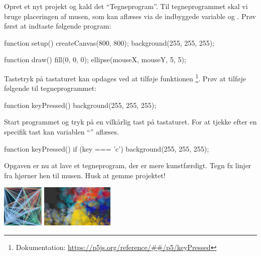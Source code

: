 \documentclass{ucph-handout}
\begin{document}
\begin{exercisebox}[adjusted title=Input fra musen]
\vspace{-2mm}
Opret et nyt projekt og kald det ``Tegneprogram''. Til tegneprogrammet
skal vi bruge placeringen af musen, som kan aflæses via de indbyggede variable
 og . Prøv først at indtaste følgende program:
\begin{javascript}
function setup() {
    createCanvas(800, 800);
    background(255, 255, 255);
}

function draw() {
    fill(0, 0, 0);
    ellipse(mouseX, mouseY, 5, 5);
}
\end{javascript}
\vspace{-4mm}
\end{exercisebox}

\begin{exercisebox}[adjusted title=Tastatur input]
\vspace{-2mm}
Tastetryk på tastaturet kan opdages ved at tilføje funktionen
\footnote{Dokumentation: \url{https://p5js.org/reference/##/p5/keyPressed}}. Prøv at tilføje følgende til tegneprogrammet:

\begin{javascript}
function keyPressed() {
    background(255, 255, 255);
}
\end{javascript}

Start programmet og tryk på en vilkårlig tast på tastaturet. For at
tjekke efter en specifik tast kan variablen ``'' aflæses.

\begin{javascript}
function keyPressed() {
    if (key === 'c') {
        background(255, 255, 255);
    }
  }
\end{javascript}
\vspace{-4mm}
\end{exercisebox}

\begin{exercisebox}[adjusted title=Kreativt tegneprogram]
\vspace{-2mm}
Opgaven er nu at lave et tegneprogram, der er mere kunstfærdigt. Tegn
fx linjer fra hjørner hen til musen. Husk at gemme projektet!
\begin{center}
  \includegraphics[height=2cm]{../illustrations/images/tegneprogram2.png}
  \quad
  \includegraphics[height=2cm]{../illustrations/images/tegneprogram.png}
\end{center}
\end{exercisebox}
\end{document}
